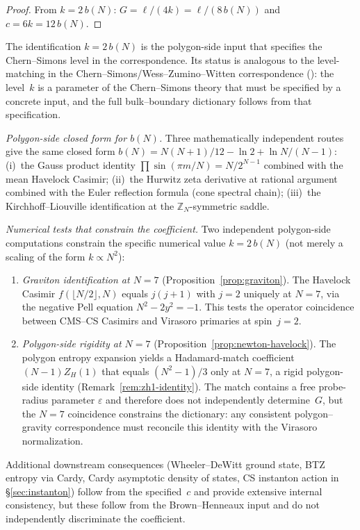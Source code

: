 \begin{proof}
From $k = 2\,b(N)$: $G = \ell/(4k) = \ell/(8\,b(N))$
and $c = 6k = 12\,b(N)$.
\end{proof}

\begin{remark}[Status of the identification $k = 2\,b(N)$]
\label{rmk:central-charge-open}
The identification $k = 2\,b(N)$ is the polygon-side
input that specifies the Chern--Simons level in the
correspondence. Its status is analogous to the
level-matching in the Chern--Simons/Wess--Zumino--Witten
correspondence (\citealt{Witten1989Jones}): the level~$k$
is a parameter of the Chern--Simons theory that must be
specified by a concrete input, and the full bulk--boundary
dictionary follows from that specification.

\emph{Polygon-side closed form for $b(N)$.}
Three mathematically independent routes give the same
closed form $b(N) = N(N{+}1)/12 - \ln 2 + \ln N/(N{-}1)$:
(i)~the Gauss product identity $\prod\sin(\pi m/N) = N/2^{N-1}$
combined with the mean Havelock Casimir;
(ii)~the Hurwitz zeta derivative at rational argument
combined with the Euler reflection formula
(cone spectral chain);
(iii)~the Kirchhoff--Liouville identification at the
$\mathbb{Z}_N$-symmetric saddle.

\emph{Numerical tests that constrain the coefficient.}
Two independent polygon-side computations constrain the
specific numerical value $k = 2\,b(N)$
(not merely a scaling of the form $k \propto N^2$):
\begin{enumerate}
\item[(T1)] \emph{Graviton identification at $N=7$}
  (Proposition~\ref{prop:graviton}). The Havelock Casimir
  $f(\lfloor N/2\rfloor, N)$ equals $j(j{+}1)$ with
  $j=2$ uniquely at $N=7$, via the negative Pell equation
  $N^2 - 2y^2 = -1$. This tests the operator coincidence
  between CMS--CS Casimirs and Virasoro primaries at
  spin~$j=2$.
\item[(T2)] \emph{Polygon-side rigidity at $N = 7$}
  (Proposition~\ref{prop:newton-havelock}).
  The polygon entropy expansion yields a Hadamard-match
  coefficient $(N{-}1) Z_H(1)$ that equals $(N^2{-}1)/3$
  only at $N = 7$, a rigid polygon-side identity
  (Remark~\ref{rem:zh1-identity}). The match contains a
  free probe-radius parameter $\varepsilon$ and therefore
  does not independently determine~$G$, but the $N = 7$
  coincidence constrains the dictionary: any consistent
  polygon--gravity correspondence must reconcile this
  identity with the Virasoro normalization.
\end{enumerate}
Additional downstream consequences
(Wheeler--DeWitt ground state, BTZ entropy via Cardy,
Cardy asymptotic density of states, CS instanton action
in \S\ref{sec:instanton}) follow from the specified~$c$
and provide extensive internal consistency, but these
follow from the Brown--Henneaux input and do not
independently discriminate the coefficient.


\end{remark}
